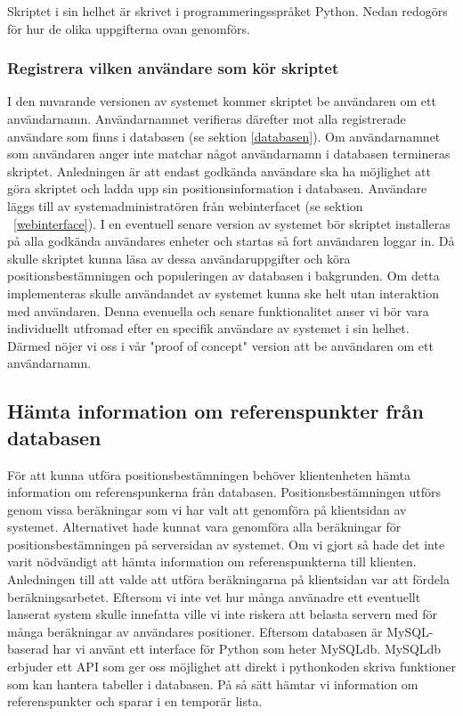 \documentclass[swedish, a4paper,12pt]{article}
\begin{document}
Skriptet i sin helhet är skrivet i programmeringsspråket Python.
Nedan redogörs för hur de olika uppgifterna ovan genomförs. %

\subsubsection{Registrera vilken användare som kör skriptet}
I den nuvarande versionen av systemet kommer skriptet be användaren om ett användarnamn.
Användarnamnet verifieras därefter mot alla registrerade användare som finns i databasen (se sektion \ref{databasen}). Om användarnamnet som användaren anger inte matchar något användarnamn i databasen termineras skriptet. Anledningen är att endast godkända användare ska ha möjlighet att göra skriptet och ladda upp sin positionsinformation i databasen. Användare läggs till av systemadministratören från webinterfacet (se sektion ~\ref{webinterface}). I en eventuell senare version av systemet bör skriptet installeras på alla godkända användares enheter och startas så fort användaren loggar in. Då skulle  skriptet kunna läsa av dessa användaruppgifter och köra positionsbestämningen och populeringen av databasen i bakgrunden. Om detta implementeras skulle användandet av systemet kunna ske helt utan interaktion med användaren. Denna evenuella och senare funktionalitet anser vi bör vara individuellt utfromad efter en specifik användare av systemet i sin helhet. Därmed nöjer vi oss i vår "proof of concept" version att be användaren om ett användarnamn.

\subsection{Hämta information om referenspunkter från databasen}\label{HamtaInfoDB}
För att kunna utföra positionsbestämningen behöver klientenheten hämta information om referenspunkerna från databasen. Positionsbestämningen utförs genom vissa beräkningar som vi har valt att genomföra på klientsidan av systemet. Alternativet hade kunnat vara genomföra alla beräkningar för positionsbestämningen på serversidan av systemet. Om vi gjort så hade det inte varit nödvändigt att hämta information om referenspunkterna till klienten. Anledningen till att valde att utföra beräkningarna på klientsidan var att fördela beräkningsarbetet. Eftersom vi inte vet hur många använadre ett eventuellt lanserat system skulle innefatta ville vi inte riskera att belasta servern med för många beräkningar av användares positioner. Eftersom databasen är MySQL-baserad har vi använt ett interface för Python som heter MySQLdb\cite{mysqldb}. MySQLdb erbjuder ett API som ger oss möjlighet att direkt i pythonkoden skriva funktioner som kan hantera tabeller i databasen. På så sätt hämtar vi information om referenspunkter och sparar i en temporär lista.
\end{document}
